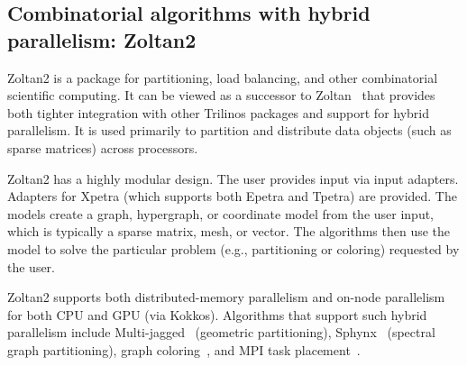 \subsection{Combinatorial algorithms with hybrid parallelism: Zoltan2}
Zoltan2 is a package for partitioning, load balancing, and other combinatorial scientific computing. It can be viewed as a successor to Zoltan~\cite{Boman2012} that provides both tighter integration with other Trilinos packages and support for hybrid parallelism. It is used primarily to partition and distribute data objects (such as sparse matrices) across processors.

Zoltan2 has a highly modular design. The user provides input via
input adapters. Adapters for Xpetra (which supports both Epetra and Tpetra) are provided. The models create a graph, hypergraph, or coordinate model from the user input, which is typically a sparse matrix, mesh, or vector. The algorithms then use the model to solve the particular problem (e.g., partitioning or coloring) requested by the user.

Zoltan2 supports both distributed-memory parallelism and on-node parallelism for both CPU and GPU (via Kokkos).
Algorithms that support such hybrid parallelism include Multi-jagged~\cite{Z1} (geometric partitioning), Sphynx~\cite{Z2} (spectral graph partitioning), graph coloring~\cite{Z5}, and MPI task placement~\cite{Z3}.
